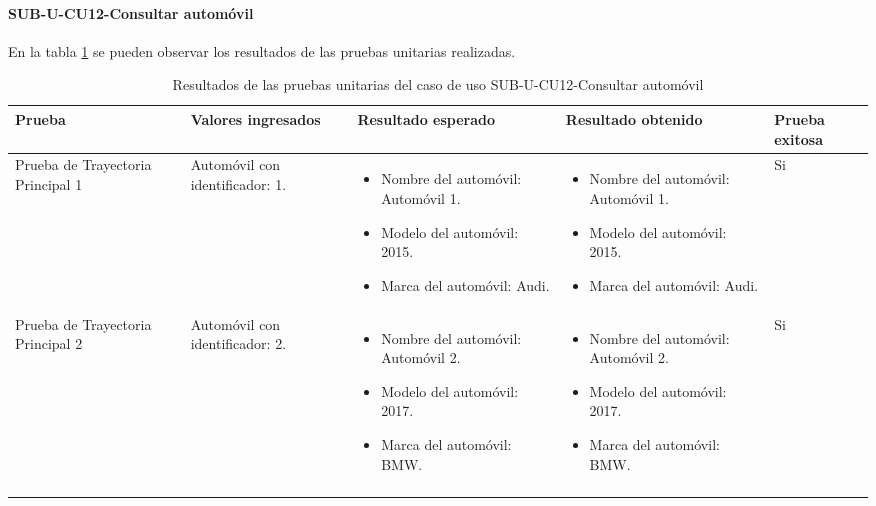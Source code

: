 \paragraph{SUB-U-CU12-Consultar automóvil}\label{SUB-U-CU12:Pruebas}
En la tabla \ref{pruebas_unitarias_sub-u-cu12} se pueden observar los resultados de las pruebas unitarias realizadas.
\begin{longtable}{|M{2cm}| M{4.5cm}|M{3cm}|M{3cm}|M{1.5cm}|}
	\hline
	\textbf{Prueba} & \textbf{Valores ingresados} & \textbf{Resultado esperado} & \textbf{Resultado obtenido} & \textbf{Prueba exitosa} \\ \hline
	Prueba de Trayectoria Principal 1 & 
	Automóvil con identificador: 1.
	& 
	\begin{itemize}
		\item Nombre del automóvil: Automóvil 1.
		\item Modelo del automóvil: 2015.
		\item Marca del automóvil: Audi.
	\end{itemize}
	&
	\begin{itemize}
		\item Nombre del automóvil: Automóvil 1.
		\item Modelo del automóvil: 2015.
		\item Marca del automóvil: Audi.
	\end{itemize}
	& Si \\ \hline

	Prueba de Trayectoria Principal 2 & 
	Automóvil con identificador: 2.
	& 
	\begin{itemize}
		\item Nombre del automóvil: Automóvil 2.
		\item Modelo del automóvil: 2017.
		\item Marca del automóvil: BMW.
	\end{itemize}
	&
	\begin{itemize}
		\item Nombre del automóvil: Automóvil 2.
		\item Modelo del automóvil: 2017.
		\item Marca del automóvil: BMW.
	\end{itemize}
	& Si \\ \hline

	\caption{Resultados de las pruebas unitarias del caso de uso SUB-U-CU12-Consultar automóvil}
	\label{pruebas_unitarias_sub-u-cu12}
\end{longtable}
